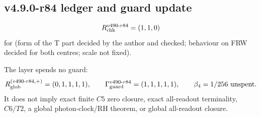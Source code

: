 \subsection*{v4.9.0-r84 ledger and guard update}
\label{subsec:v490-r84-ledger-guard}

\[
R_{\rm chk}^{v490\text{-}r84}=(1,1,0)
\]
for (form of the T part decided by the author and checked; behaviour on FRW decided for both centres; scale not fixed).

The layer spends no guard:
\[
R_{\rm glob}^{(v490\text{-}r84,+)}=(0,1,1,1,1),
\qquad
\Gamma_{\rm guard}^{v490\text{-}r84}=(1,1,1,1,1),
\qquad
\beta_4=1/256\ \text{unspent}.
\]
It does not imply exact finite \(C5\) zero closure, exact all-readout terminality,
\(C6/T2\), a global photon-clock/RH theorem, or global all-readout closure.
